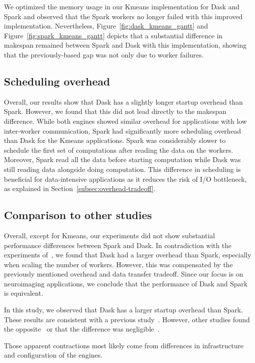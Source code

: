 \documentclass[AMA,STIX1COL]{WileyNJD-v2}
\newcommand{\HL}[1]{#1}
\begin{document}
We optimized the memory usage in our Kmeans implementation for Dask and Spark
and observed that the Spark workers no longer failed with this improved implementation.
Nevertheless, Figure~{\ref{fig:dask_kmeans_gantt}} and Figure~{\ref{fig:spark_kmeans_gantt}} depicts that a substantial difference in makespan remained between Spark and Dask with this implementation,
showing that the previously-based gap was not only due to worker failures.
							
\subsection{Scheduling overhead}
Overall, our results show that Dask has a slightly longer startup overhead than Spark.
However, we found that this did not lead directly to the makespan difference.
While both engines showed similar overhead for applications with low inter-worker communication,
Spark had significantly more scheduling overhead than Dask for the Kmeans applications.
Spark was considerably slower to schedule the first set of computations after reading the data on the workers.
Moreover, Spark read all the data before starting computation while Dask was still reading data alongside doing computation.
This difference in scheduling is beneficial for data-intensive applications as it reduces the risk
of I/O bottleneck, as explained in Section~{\ref{subsec:overhead-tradeoff}}.
																	
\subsection{Comparison to other studies}
Overall, except for Kmeans, our experiments did not show substantial performance differences between Spark and Dask.
In contradiction with the experiments of~\cite{Mehta:17}, we found that Dask had a larger overhead than Spark, especially when scaling the number of workers.
However, this was compensated by the previously mentioned overhead and data transfer tradeoff.
Since our focus is on \HL{neuroimaging} applications, we conclude that the performance of Dask and Spark is equivalent.
				
\HL{
	In this study, we observed that Dask has a larger startup overhead than Spark.
	These results are consistent with a previous study~{\cite{Mehta:17}}.
	However, other studies found the opposite~{\cite{8588652}} or that the difference was negligible~{\cite{8943502}}.
}
Those apparent contractions most likely come from differences in infrastructure and configuration of the engines.
																	
\end{document}
